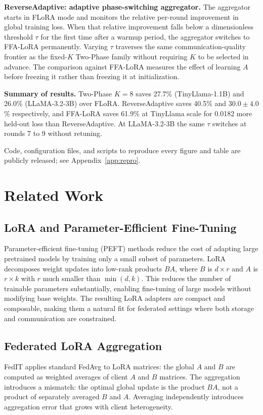 \documentclass[iicol,pdflatex,sn-mathphys-num]{sn-jnl}
\begin{document}
\textbf{ReverseAdaptive: adaptive phase-switching aggregator.}
The aggregator starts in FLoRA mode and monitors the relative per-round improvement in global training loss. When that relative improvement falls below a dimensionless threshold $\tau$ for the first time after a warmup period, the aggregator switches to FFA-LoRA permanently. Varying $\tau$ traverses the same communication-quality frontier as the fixed-$K$ Two-Phase family without requiring $K$ to be selected in advance. The comparison against FFA-LoRA measures the effect of learning $A$ before freezing it rather than freezing it at initialization.

\textbf{Summary of results.}
Two-Phase $K{=}8$ saves 27.7\% (TinyLlama-1.1B) and 26.0\% (LLaMA-3.2-3B) over FLoRA. ReverseAdaptive saves 40.5\% and $30.0 \pm 4.0$\% respectively, and FFA-LoRA saves 61.9\% at TinyLlama scale for 0.0182 more held-out loss than ReverseAdaptive. At LLaMA-3.2-3B the same $\tau$ switches at rounds 7 to 9 without retuning.

Code, configuration files, and scripts to reproduce every figure and table are publicly released; see Appendix~\ref{app:repro}.

\section{Related Work}
\label{sec:related}

\subsection{LoRA and Parameter-Efficient Fine-Tuning}
Parameter-efficient fine-tuning (PEFT) methods reduce the cost of adapting large pretrained models by training only a small subset of parameters. LoRA \cite{hu2022lora} decomposes weight updates into low-rank products $BA$, where $B$ is $d \times r$ and $A$ is $r \times k$ with $r$ much smaller than $\min(d,k)$. This reduces the number of trainable parameters substantially, enabling fine-tuning of large models without modifying base weights. The resulting LoRA adapters are compact and composable, making them a natural fit for federated settings where both storage and communication are constrained.

\subsection{Federated LoRA Aggregation}
FedIT \cite{zhang2024federatedgpt} applies standard FedAvg \cite{mcmahan2017communication} to LoRA matrices: the global $A$ and $B$ are computed as weighted averages of client $A$ and $B$ matrices. The aggregation introduces a mismatch: the optimal global update is the product $BA$, not a product of separately averaged $B$ and $A$. Averaging independently introduces aggregation error that grows with client heterogeneity.
\end{document}
